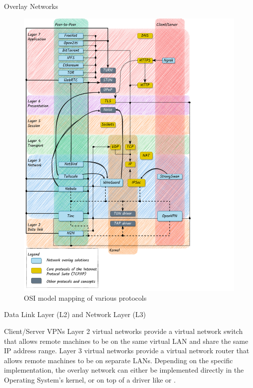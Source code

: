 \begin{block}{Overlay Networks}
\begin{figure}
\centering
\includegraphics[width=\textwidth,height=0.9\textheight]{thesis/../figures/osi-map-overlays.drawio.pdf}
\caption{OSI model mapping of various protocols \label{osi-map-overlays}}
\end{figure}

\begin{block}{Data Link Layer (L2) and Network Layer (L3)}
\label{thesis__022-overlays.md__data-link-layer-l2-and-network-layer-l3}
\begin{block}{Client/Server VPNs}
\label{thesis__022-overlays.md__clientserver-vpns}
Layer 2 virtual networks provide a virtual network switch that allows remote machines to be on the same virtual LAN and share the same IP address range. Layer 3 virtual networks provide a virtual network router that allows remote machines to be on separate LANs. Depending on the specific implementation, the overlay network can either be implemented directly in the Operating System's kernel, or on top of a driver like  or .


\end{block}
\end{block}
\end{block}
